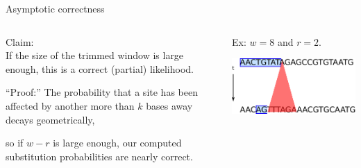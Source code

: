 \documentclass[smaller]{beamer}
\begin{document}
\begin{frame}{Asymptotic correctness}
  \begin{columns}[c]
    \begin{column}{.4\textwidth}

  {\struct Claim:} \\
  If the size of the trimmed window is large enough, this is a {\newthing correct} (partial) likelihood.

  \vspace{2em}

  {\struct ``Proof:''}
  The probability that a site has been affected by another more than $k$ bases away decays geometrically,

  \vspace{2em}

  so if $w-r$ is large enough, our computed substitution probabilities are nearly correct.

    \end{column}
    \begin{column}{.6\textwidth}

      Ex: $w=8$ and $r=2$.

  \vspace{1em}

  \includegraphics{../../writeup-plots/talk-dependency-proof-fig}

    \end{column}
  \end{columns}

\end{frame}
\end{document}
